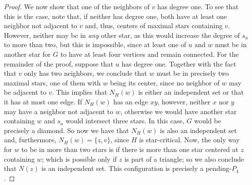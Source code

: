 \begin{proof}
   We now show that one of the neighbors of $v$ has degree one.
   To see that this is the case, note that, if neither has degree one, both have at least one neighbor not adjacent to $v$ and, thus, centers of maximal stars containing $v$.
   However, neither may be in \textit{any} other star, as this would increase the degree of $s_a$ to more than two, but this is impossible, since at least one of $u$ and $w$ must be in another star for $G$ to have at least four vertices and remain connected.
   For the remainder of the proof, suppose that $u$ has degree one.
   Together with the fact that $v$ only has two neighbors, we conclude that $w$ must be in precisely two maximal stars, one of them with $w$ being its center, since no neighbor of $w$ may be adjacent to $v$.
   This implies that $N_H(w)$ is either an independent set or that it has at most one edge.
   If $N_H(w)$ has an edge $xy$, however, neither $x$ nor $y$ may have a neighbor not adjacent to $w$, otherwise we would have another star containing $w$ and $s_a$ would intersect three stars.
   In this case, $G$ would be precisely a diamond.
   So now we have that $N_H(w)$ is also an independent set and, furthermore, $N_H(w) = \{z, v\}$, since $H$ is star-critical.
   Now, the only way for $w$ to be in more than two stars is if there is more than one star centered at $z$ containing $w$; which is possible only if $z$ is part of a triangle; so we also conclude that $N(z)$ is an independent set.
   This configuration is precisely a pending-$P_4$.
   

\end{proof}
